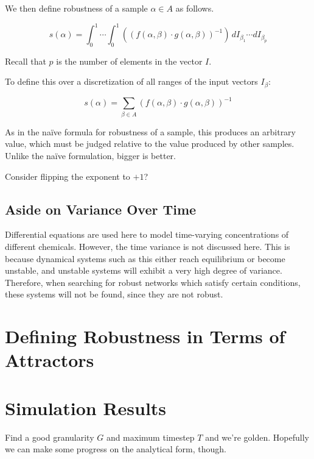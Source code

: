 \documentclass{article}
\begin{document}
We then define robustness of a sample $\alpha \in A$ as follows.

\begin{equation}
  s(\alpha) = \int_0^1 \cdots \int_0^1 ((f(\alpha, \beta) \cdot g(\alpha, \beta))^{-1}) \,dI_{\beta_1} \cdots dI_{\beta_p}
\end{equation}

Recall that $p$ is the number of elements in the vector $I$.

To define this over a discretization of all ranges of the input vectors $I_\beta$:

\begin{equation}
  s(\alpha) = \sum_{\beta \in A}{(f(\alpha, \beta) \cdot g(\alpha, \beta))^{-1}}
\end{equation}

As in the na\"ive formula for robustness of a sample, this produces an arbitrary value, which must be judged relative to the value produced by other samples. Unlike the na\"ive formulation, bigger is better.

Consider flipping the exponent to $+1$?

\subsection{Aside on Variance Over Time}

Differential equations are used here to model time-varying concentrations of different chemicals. However, the time variance is not discussed here. This is because dynamical systems such as this either reach equilibrium or become unstable, and unstable systems will exhibit a very high degree of variance. Therefore, when searching for robust networks which satisfy certain conditions, these systems will not be found, since they are not robust.

\section{Defining Robustness in Terms of Attractors}


\section{Simulation Results}
Find a good granularity $G$ and maximum timestep $T$ and we're golden. Hopefully we can make some progress on the analytical form, though.



\end{document}
